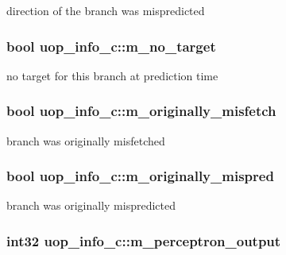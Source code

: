 \label{classuop__info__c_aa8c135a846af6e973cab44b6527ae96a}
direction of the branch was mispredicted \hypertarget{classuop__info__c_a7224054a99355aa84ccdb62549837145}{
\subsubsection[{m\_\-no\_\-target}]{\setlength{\rightskip}{0pt plus 5cm}bool {\bf uop\_\-info\_\-c::m\_\-no\_\-target}}}
\label{classuop__info__c_a7224054a99355aa84ccdb62549837145}
no target for this branch at prediction time \hypertarget{classuop__info__c_a9e508d92a0b1921a98148b3f920dda7f}{
\subsubsection[{m\_\-originally\_\-misfetch}]{\setlength{\rightskip}{0pt plus 5cm}bool {\bf uop\_\-info\_\-c::m\_\-originally\_\-misfetch}}}
\label{classuop__info__c_a9e508d92a0b1921a98148b3f920dda7f}
branch was originally misfetched \hypertarget{classuop__info__c_a914f7457415859152e3b63e8cc3e6f6c}{
\subsubsection[{m\_\-originally\_\-mispred}]{\setlength{\rightskip}{0pt plus 5cm}bool {\bf uop\_\-info\_\-c::m\_\-originally\_\-mispred}}}
\label{classuop__info__c_a914f7457415859152e3b63e8cc3e6f6c}
branch was originally mispredicted \hypertarget{classuop__info__c_a2f7e5f232a3868929da19c5b7ef629a5}{
\subsubsection[{m\_\-perceptron\_\-output}]{\setlength{\rightskip}{0pt plus 5cm}int32 {\bf uop\_\-info\_\-c::m\_\-perceptron\_\-output}}}
\label{classuop__info__c_a2f7e5f232a3868929da19c5b7ef629a5}
